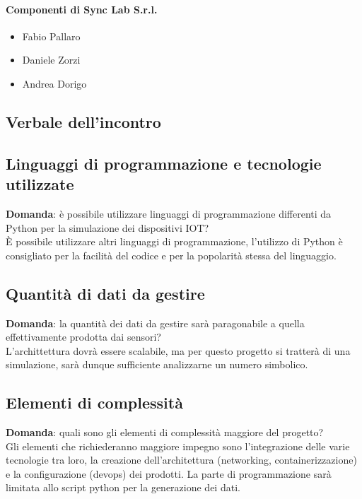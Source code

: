 \documentclass[italian,12pt]{article} %
\begin{document}
\paragraph{Componenti di Sync Lab S.r.l.}

\begin{itemize}
	\item Fabio Pallaro
	\item Daniele Zorzi
	\item Andrea Dorigo
\end{itemize}

\newpage

\begin{flushleft}
\section{Verbale dell'incontro}
\subsection{Linguaggi di programmazione e tecnologie utilizzate}
	\textbf{Domanda}: è possibile utilizzare linguaggi di programmazione differenti da Python per la simulazione dei dispositivi IOT?\\
	È possibile utilizzare altri linguaggi di programmazione, l'utilizzo di Python è consigliato per la facilità del codice e per la popolarità stessa del linguaggio.


\subsection{Quantità di dati da gestire}
	\textbf{Domanda}: la quantità dei dati da gestire sarà paragonabile a quella effettivamente prodotta dai sensori?\\
	L'archittettura dovrà essere scalabile, ma per questo progetto si tratterà di una simulazione, sarà dunque sufficiente analizzarne un numero simbolico.

\subsection{Elementi di complessità}
	\textbf{Domanda}: quali sono gli elementi di complessità maggiore del progetto?\\
	Gli elementi che richiederanno maggiore impegno sono l'integrazione delle varie tecnologie tra loro, la creazione dell'architettura (networking, containerizzazione) e la configurazione (devops) dei prodotti. La parte di programmazione sarà limitata allo script python per la generazione dei dati.


\end{flushleft}
\end{document}
